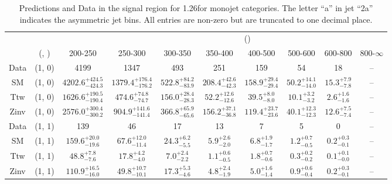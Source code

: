 \begin{table}[h!]
\tiny
\centering
\caption{Predictions and Data in the signal region for 1.26\fbinv for monojet categories. The letter ``a'' in jet \eg ``2a''  indicates the asymmetric jet bins. All entries are non-zero but are truncated to one decimal place.\label{tab:predall_sig_comb_mono}}
\begin{tabular}
{cccccccccc}
	\hline\hline
&	&	& \multicolumn{8}{c}{\scalht (\gev)}\\ 
	&	 (\njet, \nb) & 200-250 & 250-300 & 300-350 & 350-400 & 400-500 & 500-600 & 600-800 & 800-$\infty$ \\ [0.8ex] 
\hline
	Data & (1, 0) & 4199 & 1347 & 493 & 251 & 159 & 54 & 18 & -- \\[0.5ex] 
	SM & (1, 0) & $4202.6^{+ 424.5 }_{- 424.3 }$ & $1379.4^{+ 176.4 }_{- 176.2 }$ & $522.8^{+ 84.2 }_{- 83.9 }$ & $208.4^{+ 42.6 }_{- 42.3 }$ & $158.9^{+ 29.4 }_{- 29.4 }$ & $50.2^{+ 14.1 }_{- 14.0 }$ & $15.3^{+ 7.9 }_{- 7.8 }$ & -- \\[0.5ex] 
	Ttw & (1, 0) & $1626.6^{+ 190.5 }_{- 190.4 }$ & $474.6^{+ 74.8 }_{- 74.7 }$ & $156.0^{+ 28.4 }_{- 28.3 }$ & $52.2^{+ 12.6 }_{- 12.6 }$ & $39.5^{+ 8.0 }_{- 8.0 }$ & $10.1^{+ 3.2 }_{- 3.2 }$ & $2.6^{+ 1.6 }_{- 1.6 }$ & -- \\[0.5ex] 
	Zinv & (1, 0) & $2576.0^{+ 300.4 }_{- 300.2 }$ & $904.9^{+ 141.6 }_{- 141.4 }$ & $366.8^{+ 65.9 }_{- 65.6 }$ & $156.2^{+ 37.1 }_{- 36.8 }$ & $119.4^{+ 23.7 }_{- 23.6 }$ & $40.1^{+ 12.3 }_{- 12.3 }$ & $12.6^{+ 7.5 }_{- 7.4 }$ & -- \\[0.5ex] 
	Data & (1, 1) & 139 & 46 & 17 & 13 & 7 & 5 & 0 & -- \\[0.5ex] 
	SM & (1, 1) & $159.6^{+ 20.0 }_{- 19.6 }$ & $67.6^{+ 12.0 }_{- 11.4 }$ & $24.3^{+ 6.2 }_{- 5.5 }$ & $5.9^{+ 2.6 }_{- 2.0 }$ & $6.8^{+ 1.9 }_{- 1.7 }$ & $1.2^{+ 0.7 }_{- 0.5 }$ & $0.2^{+ 0.3 }_{- 0.1 }$ & -- \\[0.5ex] 
	Ttw & (1, 1) & $48.8^{+ 7.8 }_{- 7.6 }$ & $17.8^{+ 4.2 }_{- 4.0 }$ & $7.0^{+ 2.4 }_{- 2.2 }$ & $1.1^{+ 0.6 }_{- 0.5 }$ & $1.8^{+ 0.7 }_{- 0.6 }$ & $0.3^{+ 0.2 }_{- 0.2 }$ & $0.1^{+ 0.1 }_{- 0.0 }$ & -- \\[0.5ex] 
	Zinv & (1, 1) & $110.9^{+ 16.5 }_{- 16.0 }$ & $49.8^{+ 10.7 }_{- 10.1 }$ & $17.3^{+ 5.3 }_{- 4.6 }$ & $4.8^{+ 2.4 }_{- 1.9 }$ & $5.0^{+ 1.6 }_{- 1.4 }$ & $0.9^{+ 0.6 }_{- 0.4 }$ & $0.2^{+ 0.3 }_{- 0.1 }$ & -- \\[0.5ex] 
	\hline
	\hline
\end{tabular}
\end{table}
